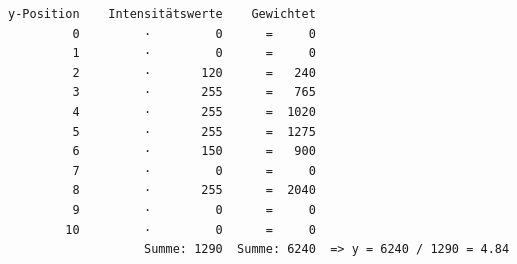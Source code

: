 \documentclass[a4paper,10pt]{scrartcl}
\begin{document}
\begin{minipage}{\textwidth}
\begin{minipage}{0.95\textwidth}
\begin{verbatim}
y-Position    Intensitätswerte    Gewichtet
         0         ·         0      =     0
         1         ·         0      =     0
         2         ·       120      =   240
         3         ·       255      =   765
         4         ·       255      =  1020
         5         ·       255      =  1275
         6         ·       150      =   900
         7         ·         0      =     0
         8         ·       255      =  2040
         9         ·         0      =     0
        10         ·         0      =     0
                   Summe: 1290  Summe: 6240  => y = 6240 / 1290 = 4.84
\end{verbatim}
\end{minipage}\begin{minipage}{0.04\textwidth}

\end{minipage}
\end{minipage}
\end{document}
